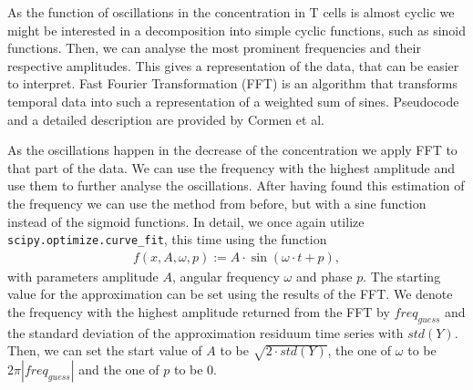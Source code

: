 %	
%				
%	

As the function of oscillations in the \Calcium concentration in T cells is almost cyclic we might be interested in a decomposition into simple cyclic functions, such as sinoid functions. Then, we can analyse the most prominent frequencies and their respective amplitudes. This gives a representation of the data, that can be easier to interpret. Fast Fourier Transformation (FFT) is an algorithm that transforms temporal data into such a representation of a weighted sum of sines. Pseudocode and a detailed description are provided by Cormen et al\cite{Cormen2009}.

As the oscillations happen in the decrease of the \Calcium concentration we apply FFT to that part of the data. We can use the frequency with the highest amplitude and use them to further analyse the oscillations. After having found this estimation of the frequency we can use the method from before, but with a sine function instead of the sigmoid functions. In detail, we once again utilize \texttt{scipy.optimize.curve\_fit}, this time using the function
\begin{align*}
	f(x, A, \omega, p) := A \cdot \sin(\omega \cdot t + p),
\end{align*}
with parameters amplitude $A$, angular frequency $\omega$ and phase $p$. The starting value for the approximation can be set using the results of the FFT. We denote the frequency with the highest amplitude returned from the FFT by $freq_{guess}$ and the standard deviation of the approximation residuum time series with $std(Y)$. Then, we can set the start value of $A$ to be $\sqrt{2 \cdot std(Y)}$, the one of $\omega$ to be $2\pi |freq_{guess}|$ and the one of $p$ to be $0$.

